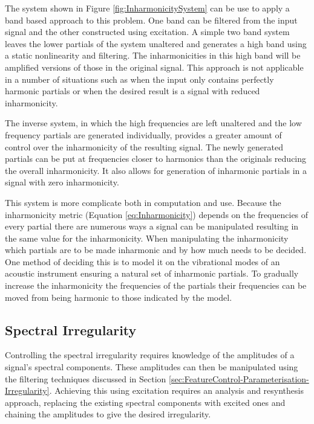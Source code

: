 		The system shown in Figure \ref{fig:InharmonicitySystem} can be use to apply a band based approach to
		this problem. One band can be filtered from the input signal and the other constructed using excitation.
		A simple two band system leaves the lower partials of the system unaltered and generates a high band using
		a static nonlinearity and filtering. The inharmonicities in this high band will be amplified versions of
		those in the original signal. This approach is not applicable in a number of situations such as when the
		input only contains perfectly harmonic partials or when the desired result is a signal with reduced
		inharmonicity.

		The inverse system, in which the high frequencies are left unaltered and the low frequency partials are
		generated individually, provides a greater amount of control over the inharmonicity of the resulting
		signal. The newly generated partials can be put at frequencies closer to harmonics than the originals
		reducing the overall inharmonicity. It also allows for generation of inharmonic partials in a signal with
		zero inharmonicity. 

		This system is more complicate both in computation and use. Because the inharmonicity metric (Equation
		\ref{eq:Inharmonicity}) depends on the frequencies of every partial there are numerous ways a signal can be
		manipulated resulting in the same value for the inharmonicity. When manipulating the inharmonicity which
		partials are to be made inharmonic and by how much needs to be decided. One method of deciding this is to
		model it on the vibrational modes of an acoustic instrument ensuring a natural set of inharmonic partials.
		To gradually increase the inharmonicity the frequencies of the partials their frequencies can be moved from
		being harmonic to those indicated by the model.

	\subsection{Spectral Irregularity}
	\label{sec:FeatureControl-Control-Irregularity}
		Controlling the spectral irregularity requires knowledge of the amplitudes of a signal's spectral
		components. These amplitudes can then be manipulated using the filtering techniques discussed in Section
		\ref{sec:FeatureControl-Parameterisation-Irregularity}. Achieving this using excitation requires an
		analysis and resynthesis approach, replacing the existing spectral components with excited ones and
		chaining the amplitudes to give the desired irregularity. 

